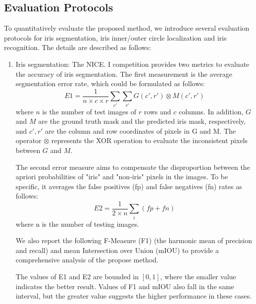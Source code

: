 \documentclass[journal]{IEEEtran}
\begin{document}
\subsection{Evaluation Protocols}
\label{sec::evaluation}
To quantitatively evaluate the proposed method, we introduce several evaluation protocols for iris segmentation, iris inner/outer circle localization and iris recognition. The details are described as follows:
\begin{enumerate}
  \item Iris segmentation: The NICE. I competition\cite{nice1} provides two metrics to evaluate the accuracy of iris segmentation. The first measurement is the average segmentation error rate, which could be formulated as follows:
\begin{equation}
E1=\frac{1}{n\times c\times r}\sum_{c'}\sum_{r'}G(c', r')\otimes M(c', r')
\end{equation}
   where $n$ is the number of test images of $r$ rows and $c$ columns. In addition, $G$ and $M$ are the ground truth mask and the predicted iris mask, respectively, and $c', r'$ are the column and row coordinates of pixels in G and M. The operator $\otimes$ represents the XOR operation to evaluate the inconsistent pixels between $G$ and $M$.

\quad The second error measure aims to compensate the disproportion between the apriori probabilities of "iris" and "non-iris" pixels in the images. To be specific, it averages the false positives (fp) and false negatives (fn) rates as follows:
\begin{equation}
E2=\frac{1}{2 \times n}\sum_i(fp+fn)
\end{equation}
  where n is the number of testing images.

\quad We also report the following F-Measure (F1) (the harmonic mean of precision and recall)\cite{hofbauer2014ground} and mean Intersection over Union (mIOU) to provide a comprehensive analysis of the propose method.

\quad The values of E1 and E2 are bounded in $[0,1]$, where the smaller value indicates the better result. Values of F1 and mIOU also fall in the same interval, but the greater value suggests the higher performance in these cases.


\end{enumerate}
\end{document}
